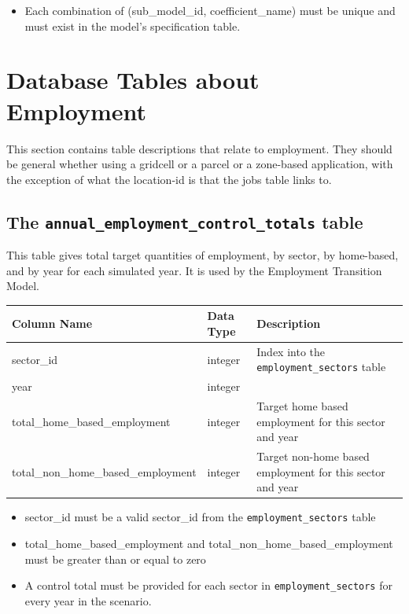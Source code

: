 \begin{itemize} \tight
\item Each combination of (sub_model_id, coefficient_name) must be unique and must exist in the model's specification table.
\end{itemize}

\section{Database Tables about Employment}
\label{sec:employment-tables}

This section contains table descriptions that relate to employment.  They should be general whether using a gridcell or a parcel or a zone-based 
application, with the exception of what the location-id is that the jobs table links to.

\subsection{The {\tt annual_employment_control_totals} table}

This table gives total target quantities of employment, by sector, by
home-based, and by year for each simulated year. It is used by the Employment Transition Model.

\begin{tabular}{lll}
\textbf{Column Name} & \textbf{Data Type} & \textbf{Description} \\

\hline
sector_id & integer & Index into the \verb|employment_sectors| table  \\
\hline
year & integer & \\
\hline
total_home_based_employment & integer &
Target home based employment for this sector and year \\
\hline
total_non_home_based_employment & integer &
Target non-home based employment for this sector and year   \\
\hline
\end{tabular}

\begin{itemize}
\tight
\item sector_id must be a valid sector_id from the \verb|employment_sectors|
table
\item total_home_based_employment and total_non_home_based_employment must be
greater than or equal to zero
\item A control total must be provided for each sector in \verb|employment_sectors| for every year in the scenario.
\end{itemize}

